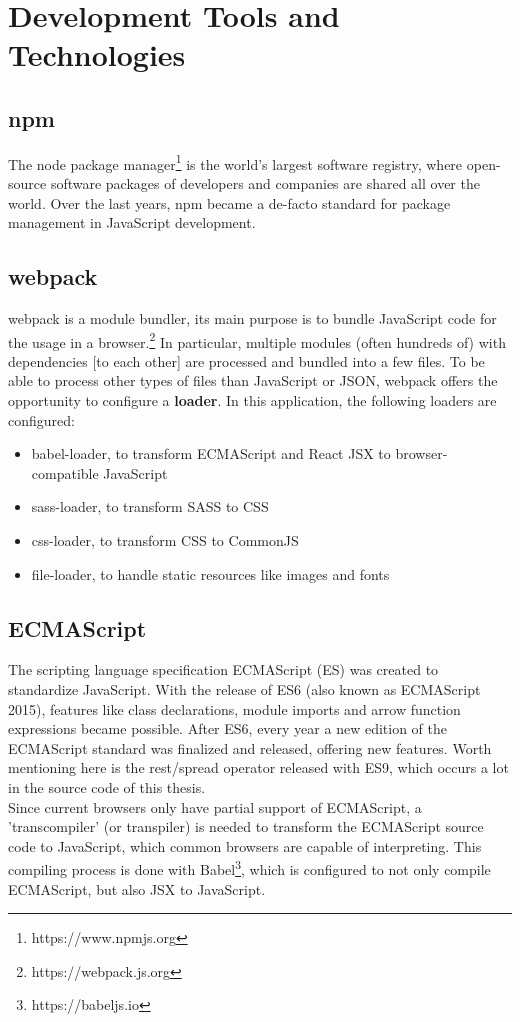\documentclass[a4paper,12pt,pdftex,halfparskip,cleardoubleempty,bibtotoc,liststotoc]{scrbook}
\begin{document}
\section{Development Tools and Technologies}
\subsection{npm}

The node package manager\footnote{https://www.npmjs.org} is the world's largest software registry, where open-source software packages of developers and companies are shared all over the world. Over the last years, npm became a de-facto standard for package management in JavaScript development.

\subsection{webpack}

webpack is a module bundler, its main purpose is to bundle JavaScript code for the usage in a browser.\footnote{https://webpack.js.org} In particular, multiple modules (often hundreds of) with dependencies [to each other] are processed and bundled into a few files. To be able to process other types of files than JavaScript or JSON, webpack offers the opportunity to configure a \textbf{loader}. In this application, the following loaders are configured:
\begin{itemize}
\item babel-loader, to transform ECMAScript and React JSX to browser-compatible JavaScript
\item sass-loader, to transform SASS to CSS
\item css-loader, to transform CSS to CommonJS
\item file-loader, to handle static resources like images and fonts
\end{itemize}

\subsection{ECMAScript}

The scripting language specification ECMAScript (ES) was created to standardize JavaScript. With the release of ES6 (also known as ECMAScript 2015), features like class declarations, module imports and arrow function expressions became possible. After ES6, every year a new edition of the ECMAScript standard was finalized and released, offering new features. Worth mentioning here is the rest/spread operator released with ES9, which occurs a lot in the source code of this thesis.\\
Since current browsers only have partial support of ECMAScript, a 'transcompiler' (or transpiler) is needed to transform the ECMAScript source code to JavaScript, which common browsers are capable of interpreting.
This compiling process is done with Babel\footnote{https://babeljs.io}, which is configured to not only compile ECMAScript, but also JSX to JavaScript.
\end{document}
